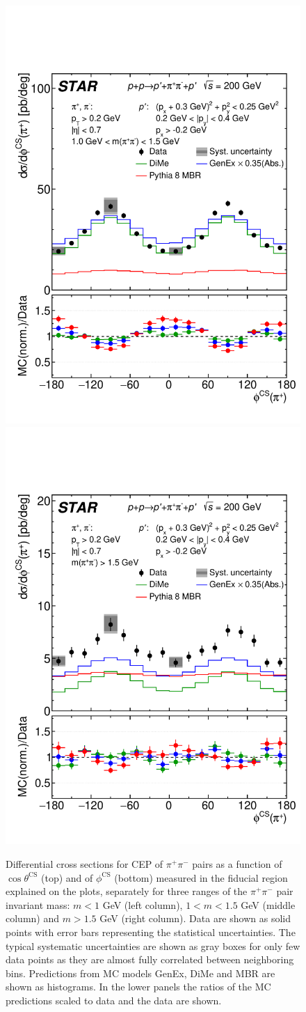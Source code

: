 \begin{figure}[t]
\hfill
\includegraphics[width=.31\textwidth,page=1]{graphics/physicsResults/Ratio_FinalResult_PhiCS_pion_MassBin_2.pdf}
\hfill
\includegraphics[width=.31\textwidth,page=1]{graphics/physicsResults/Ratio_FinalResult_PhiCS_pion_MassBin_3.pdf}
%
\caption{Differential cross sections for CEP of $\pi^+\pi^-$ pairs as a function of $\cos{\theta^\mathrm{CS}}$ (top) and of $\phi^\mathrm{CS}$ (bottom)  measured in the fiducial region explained on the plots, separately for three ranges of the $\pi^+\pi^-$ pair invariant mass: $m<1$ GeV (left column), $1<m<1.5$ GeV (middle column) and $m>1.5$ GeV (right column). Data are shown as solid points with error bars representing the statistical uncertainties. The typical systematic uncertainties are shown as gray boxes for only few data points as they are almost fully correlated between neighboring bins. Predictions from MC models GenEx, DiMe and MBR are shown as histograms. In the lower panels the ratios of the MC predictions scaled to data and the data are shown.}
\label{results_7}
\end{figure}
